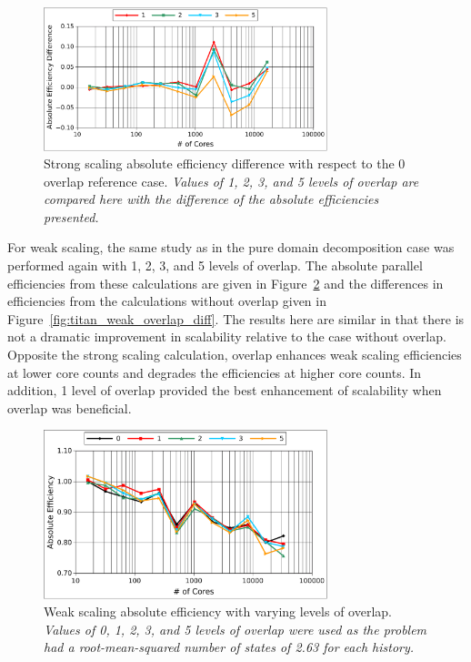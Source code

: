 \documentclass{snamc2013}
\begin{document}
\begin{figure}[h!]
  \begin{center}
    \includegraphics[width=3.25in]{titan_strong_overlap_diff.pdf}
  \end{center}
  \caption{Strong scaling absolute efficiency difference with respect
    to the 0 overlap reference case. \textit{Values of 1, 2, 3, and 5
      levels of overlap are compared here with the difference of the
      absolute efficiencies presented.}}
  \label{fig:titan_strong_overlap_diff}
\end{figure}

For weak scaling, the same study as in the pure domain decomposition
case was performed again with 1, 2, 3, and 5 levels of overlap. The
absolute parallel efficiencies from these calculations are given in
Figure~\ref{fig:titan_weak_overlap} and the differences in
efficiencies from the calculations without overlap given in
Figure~\ref{fig:titan_weak_overlap_diff}. The results here are similar
in that there is not a dramatic improvement in scalability relative to
the case without overlap. Opposite the strong scaling calculation,
overlap enhances weak scaling efficiencies at lower core counts and
degrades the efficiencies at higher core counts. In addition, 1 level
of overlap provided the best enhancement of scalability when overlap
was beneficial.

\begin{figure}[H]
  \begin{center}
    \includegraphics[width=3.25in]{titan_weak_overlap.pdf}
  \end{center}
  \caption{Weak scaling absolute efficiency with varying levels of
    overlap. \textit{Values of 0, 1, 2, 3, and 5 levels of overlap
      were used as the problem had a root-mean-squared number of
      states of 2.63 for each history.}}
  \label{fig:titan_weak_overlap}
\end{figure}
\end{document}

